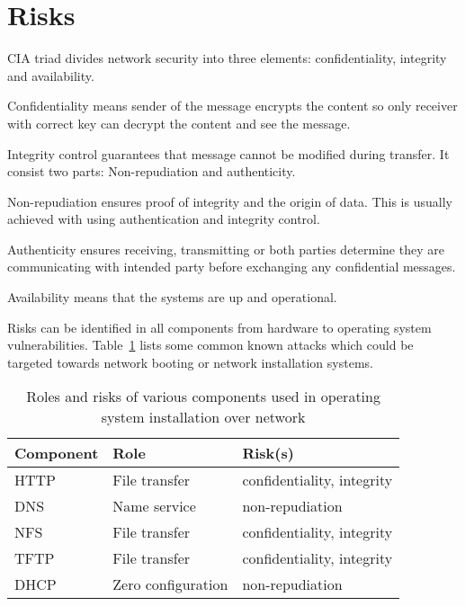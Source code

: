 \section{Risks}

CIA triad divides network security into three elements:
confidentiality, integrity and availability.

Confidentiality means sender of the message encrypts the content so
only receiver with correct key can decrypt the content and see the
message.

Integrity control guarantees that message cannot be modified during
transfer. It consist two parts: Non-repudiation and
authenticity.

Non-repudiation ensures proof of integrity and the origin of
data. This is usually achieved with using authentication and integrity
control.

Authenticity ensures receiving, transmitting or both parties determine
they are communicating with intended party before exchanging any
confidential messages.

Availability means that the systems are up and operational.

Risks can be identified in all components from hardware to operating
system vulnerabilities. Table~\ref{tab:risks_table} lists some
common known attacks which could be targeted towards network booting
or network installation systems.

\begin{table}[!ht]
  \def\arraystretch{1.1}%
  \begin{center}
   \caption{Roles and risks of various components used in operating
      system installation over network}
    \begin{tabular}{| l | l | l |}
      \hline
      Component   & Role               & Risk(s)                    \\
      \hline
      HTTP        & File transfer      & confidentiality, integrity \\
      DNS         & Name service       & non-repudiation            \\
      NFS         & File transfer      & confidentiality, integrity \\
      TFTP        & File transfer      & confidentiality, integrity \\
      DHCP        & Zero configuration & non-repudiation            \\
      \hline
    \end{tabular}
    \label{tab:risks_table}
  \end{center}
\end{table}

